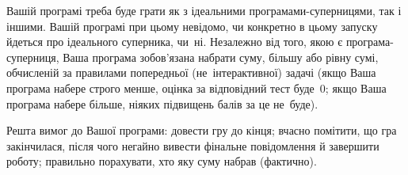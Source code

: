 Вашій програмі треба буде грати як з ідеальними програмами-суперницями, так і іншими. Вашій програмі при цьому невідомо, чи конкретно в цьому запуску йдеться про ідеального суперника, чи~ні. Незалежно від того, якою є програма-суперниця, Ваша програма зобов'язана набрати суму, більшу або рівну сумі, обчисленій за правилами попередньої (не~інтерактивної) задачі (якщо Ваша програма набере строго менше, оцінка за відповідний тест буде~0; якщо Ваша програма набере більше, ніяких підвищень балів за це не~буде).

Решта вимог до Вашої програми: довести гру до кінця; вчасно помітити, що гра закінчилася, після чого негайно вивести фінальне повідомлення й завершити роботу; правильно порахувати, хто яку суму набрав (фактично).